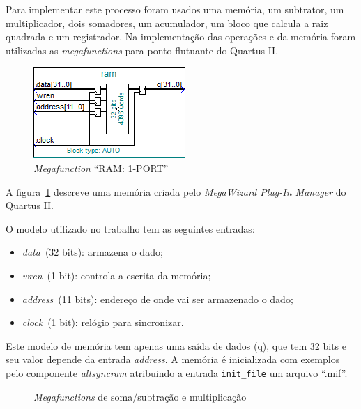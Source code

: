 \documentclass[12pt]{article}
\begin{document}
Para implementar este processo foram usados uma memória, um subtrator, um 
multiplicador, dois somadores, um acumulador, um bloco que calcula a raiz 
quadrada e um registrador.
Na implementação das operações e da memória foram utilizadas as 
\textit{megafunctions} para ponto flutuante do Quartus II.

\begin{figure}[h]
\centering
\includegraphics[width=.3\textwidth]{../apresentacao/ram}
\caption{\textit{Megafunction} ``RAM: 1-PORT''}
\label{fig:ram}
\end{figure}

A figura~\ref{fig:ram} descreve uma memória criada pelo 
\textit{MegaWizard Plug-In Manager} do Quartus II. 

O modelo utilizado no trabalho tem as seguintes entradas:
\begin{itemize}
\item \textit{data}~(32 bits): armazena o dado;
\item \textit{wren}~(1 bit): controla a escrita da memória;
\item \textit{address}~(11 bits): endereço de onde vai ser armazenado o dado;
\item \textit{clock}~(1 bit): relógio para sincronizar.
\end{itemize}

Este modelo de memória tem apenas uma saída de dados (q), que tem 32 bits e seu
valor depende da entrada \textit{address}. A memória é inicializada com
exemplos pelo componente \textit{altsyncram} atribuindo a entrada
\verb|init_file| um arquivo ``.mif''.

\begin{figure}[h]
\centering

\quad
{}
\label{fig:addsubmult}
\caption{\textit{Megafunctions} de soma/subtração e multiplicação}
\end{figure}
\end{document}
